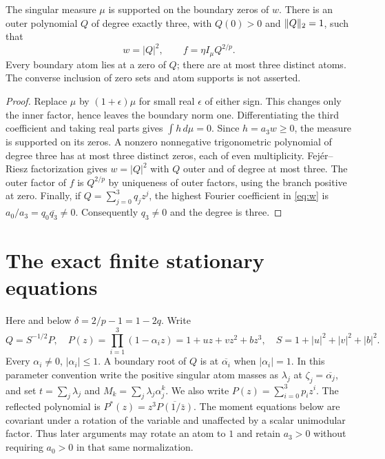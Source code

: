 \begin{lemma}
The singular measure $\mu$ is supported on the boundary zeros of $w$.
There is an outer polynomial $Q$ of degree exactly three, with $Q(0)>0$
and $\lVert Q\rVert_2=1$, such that
\[
 w=|Q|^2,\qquad f=\eta I_\mu Q^{2/p}.
\]
Every boundary atom lies at a zero of $Q$; there are at most three distinct
atoms. The converse inclusion of zero sets and atom supports is not asserted.
\end{lemma}
\begin{proof}
Replace $\mu$ by $(1+\epsilon)\mu$ for small real $\epsilon$ of either sign.
This changes only the inner factor, hence leaves the boundary norm one.
Differentiating the third coefficient and taking real parts gives
$\int h\,d\mu=0$. Since $h=a_3w\geq0$, the measure is supported on its zeros.
A nonzero nonnegative trigonometric polynomial of degree three has at most
three distinct zeros, each of even multiplicity. Fej\'er--Riesz factorization
gives $w=|Q|^2$ with $Q$ outer and of degree at most three. The outer factor
of $f$ is $Q^{2/p}$ by uniqueness of outer factors, using the branch positive
at zero. Finally, if $Q=\sum_{j=0}^3q_jz^j$, the highest Fourier coefficient
in \eqref{eq:w} is
$a_0/a_3=q_0\overline{q_3}\ne0$. Consequently $q_3\ne0$ and the degree is three.
\end{proof}

\section{The exact finite stationary equations}
Here and below $\delta=2/p-1=1-2q$.
Write
\[
 Q=S^{-1/2}P,\quad
 P(z)=\prod_{i=1}^3(1-\alpha_i z)=1+u z+v z^2+b z^3,
 \quad S=1+|u|^2+|v|^2+|b|^2.
\]
Every $\alpha_i\ne0$, $|\alpha_i|\leq1$. A boundary root of $Q$ is at
$\overline{\alpha_i}$ when $|\alpha_i|=1$. In this parameter convention write
the positive singular atom masses as $\lambda_j$ at
$\zeta_j=\overline{\alpha_j}$, and set
$t=\sum_j\lambda_j$ and $M_k=\sum_j\lambda_j\alpha_j^k$.
We also write $P(z)=\sum_{i=0}^3p_i z^i$.
The reflected polynomial is $P^*(z)=z^3\overline{P(1/\bar z)}$.
The moment equations below are covariant under a rotation of the variable
and unaffected by a scalar unimodular factor. Thus later arguments may
rotate an atom to $1$ and retain $a_3>0$ without requiring $a_0>0$ in
that same normalization.

